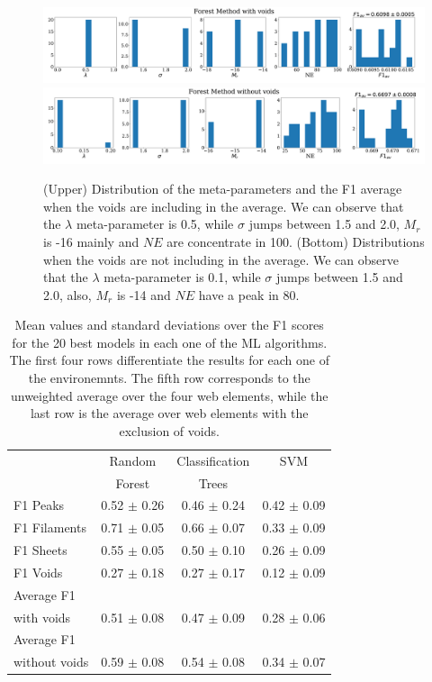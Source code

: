 \documentclass[usenatbib]{mnras}
\begin{document}
\begin{figure}
\centering
    \includegraphics[scale=0.23]{Figs/p_features_Forest_F1_av.pdf}
    \includegraphics[scale=0.23]{Figs/p_features_Forest_F1_av_no_voids.pdf}
    \caption{(Upper) Distribution of the meta-parameters and the F1 average
      when the voids are including in the average. We can observe that
      the $\lambda$ meta-parameter is 0.5, while $\sigma$
      jumps between 1.5 and 2.0, $M_r$ is -16 mainly and $NE$ are concentrate in 100.
      (Bottom) Distributions when the voids are not including in the average. We can observe that
      the $\lambda$ meta-parameter is 0.1, while $\sigma$
      jumps between 1.5 and 2.0, also, $M_r$ is -14 and $NE$ have a peak in 80.
      } 
    \label{fig:features_score}    
\end{figure}


\begin{table}
\centering
\begin{tabular}{p{1.8cm}ccc}
\hline
                  & Random               & Classification        & SVM\\
                  & Forest               & Trees                &  \\
\hline
 F1 Peaks               & 0.52 $\pm$ 0.26  & 0.46 $\pm$ 0.24 & 0.42 $\pm$ 0.09  \\
 F1 Filaments          & 0.71 $\pm$ 0.05 & 0.66 $\pm$ 0.07 & 0.33 $\pm$ 0.09 \\
 F1 Sheets             & 0.55 $\pm$ 0.05 & 0.50 $\pm$ 0.10 & 0.26 $\pm$ 0.09 \\
 F1 Voids              & 0.27 $\pm$ 0.18 & 0.27 $\pm$ 0.17 & 0.12 $\pm$ 0.09 \\
 Average F1\\ with voids    & 0.51 $\pm$ 0.08 & 0.47 $\pm$ 0.09 & 0.28 $\pm$ 0.06 \\
 Average F1\\ without voids & 0.59 $\pm$ 0.08 & 0.54 $\pm$ 0.08 & 0.34 $\pm$ 0.07 \\
\hline
\end{tabular}
\caption{Mean values and standard deviations over the F1
  scores for the 20 best models in each one of the ML algorithms.
  The first four rows differentiate the results for each one of the
  environemnts.
  The fifth row corresponds to the unweighted average over the four
  web elements, while the last row is the average over web elements
  with the exclusion of voids.}
\label{table:elements}
\end{table}
\end{document}
